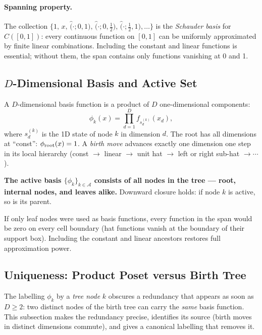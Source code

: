 \documentclass[11pt]{article}
\begin{document}
\paragraph{Spanning property.}
The collection $\{1,\, x,\, \hat(\cdot;0,1),\, \hat(\cdot;0,\tfrac12),\,
\hat(\cdot;\tfrac12,1),\ldots\}$ is the \emph{Schauder basis} for $C([0,1])$:
every continuous function on $[0,1]$ can be uniformly approximated by finite
linear combinations.  Including the constant and linear functions is essential;
without them, the span contains only functions vanishing at 0 and 1.

\subsection{$D$-Dimensional Basis and Active Set}
\label{sec:Ddim-basis}

A $D$-dimensional basis function is a product of $D$ one-dimensional
components:
\begin{equation}
  \phi_k(x) = \prod_{d=1}^D f_{s_d^{(k)}}(x_d),
  \label{eq:Ddim-phi}
\end{equation}
where $s_d^{(k)}$ is the 1D state of node $k$ in dimension $d$.
The root has all dimensions at ``const'': $\phi_{\rm root}(x) = 1$.
A \emph{birth move} advances exactly one dimension one step in its local
hierarchy (const $\to$ linear $\to$ unit hat $\to$ left or right sub-hat
$\to \cdots$).

\textbf{The active basis $\{\phi_k\}_{k\in\mathcal{A}}$ consists of all nodes
in the tree --- root, internal nodes, and leaves alike.}
Downward closure holds: if node $k$ is active, so is its parent.

\begin{remark}
If only leaf nodes were used as basis functions, every function in the span
would be zero on every cell boundary (hat functions vanish at the boundary of
their support box).  Including the constant and linear ancestors restores full
approximation power.
\end{remark}

\subsection{Uniqueness: Product Poset versus Birth Tree}
\label{sec:uniqueness}

The labelling $\phi_k$ by a \emph{tree node} $k$ obscures a redundancy that
appears as soon as $D\ge 2$: two distinct nodes of the birth tree can carry the
\emph{same} basis function.  This subsection makes the redundancy precise,
identifies its source (birth moves in distinct dimensions commute), and gives a
canonical labelling that removes it.
\end{document}
